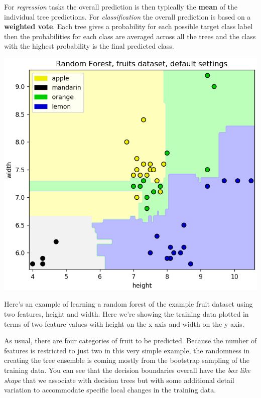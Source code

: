 For \emph{regression} tasks the overall prediction is then typically the \textbf{mean} of the individual tree predictions. For \emph{classification} the overall prediction is based on a \textbf{weighted vote}. Each tree gives a probability for each possible target class label then the probabilities for each class are averaged across all the trees and the class with the highest probability is the final predicted class. 

\begin{center}
	\includegraphics[width=\linewidth]{img/Random-Forest-Fruit-dataset.png} 
\end{center}

Here's an example of learning a random forest of the example fruit dataset using two features, height and width. Here we're showing the training data plotted in terms of two feature values with height on the x axis and width on the y axis. 

As usual, there are four categories of fruit to be predicted. Because the number of features is restricted to just two in this very simple example, the randomness in creating the tree ensemble is coming mostly from the bootstrap sampling of the training data. You can see that the decision boundaries overall have the \emph{box like shape} that we associate with decision trees but with some additional detail variation to accommodate specific local changes in the training data. 

